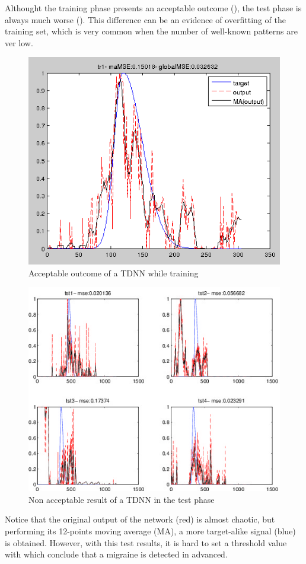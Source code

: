 Althought the training phase presents an acceptable outcome (), the test phase is always much worse (). This difference can be an evidence of overfitting of the training set, which is very common when the number of well-known patterns are ver low.

\begin{figure}[!ht]
\centering
\includegraphics[width=0.7\columnwidth]{images/results/tdnnTraining}
\caption{Acceptable outcome of a TDNN while training}
\label{fig:tdnntraining}
\end{figure}

\begin{figure}[!ht]
\centering
\includegraphics[width=0.9\columnwidth]{images/results/tdnnTest}
\caption{Non acceptable result of a TDNN in the test phase}
\label{fig:tdnntest}
\end{figure}

Notice that the original output of the network (red) is almost chaotic, but performing its 12-points moving average (MA), a more target-alike signal (blue) is obtained. However, with this test results, it is hard to set a threshold value with which conclude that a migraine is detected in advanced.



